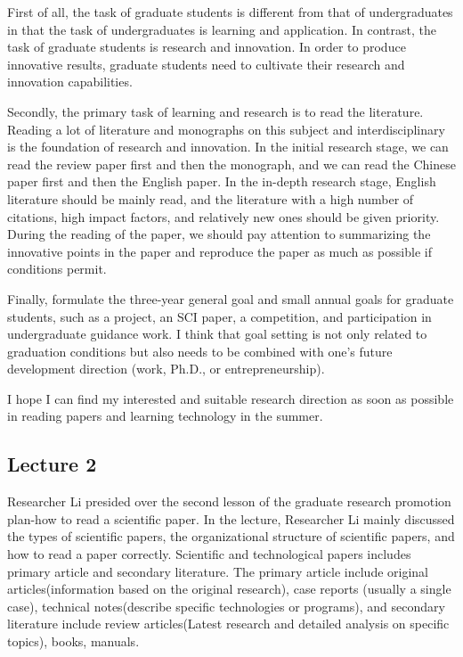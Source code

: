 \documentclass[UTF-8]{ctexart}
\begin{document}
First of all, the task of graduate students is different from that of undergraduates in that the task of undergraduates is learning and application. In contrast, the task of graduate students is research and innovation. In order to produce innovative results, graduate students need to cultivate their research and innovation capabilities.

Secondly, the primary task of learning and research is to read the literature. Reading a lot of literature and monographs on this subject and interdisciplinary is the foundation of research and innovation. In the initial research stage, we can read the review paper first and then the monograph, and we can read the Chinese paper first and then the English paper. In the in-depth research stage, English literature should be mainly read, and the literature with a high number of citations, high impact factors, and relatively new ones should be given priority. During the reading of the paper, we should pay attention to summarizing the innovative points in the paper and reproduce the paper as much as possible if conditions permit.

Finally, formulate the three-year general goal and small annual goals for graduate students, such as a project, an SCI paper, a competition, and participation in undergraduate guidance work. I think that goal setting is not only related to graduation conditions but also needs to be combined with one's future development direction (work, Ph.D., or entrepreneurship).

I hope I can find my interested and suitable research direction as soon as possible in reading papers and learning technology in the summer.

\subsection{Lecture 2}
Researcher Li presided over the second lesson of the graduate research promotion plan-how to read a scientific paper. In the lecture, Researcher Li mainly discussed the types of scientific papers, the organizational structure of scientific papers, and how to read a paper correctly.
Scientific and technological papers includes primary article and secondary literature. The primary article include original articles(information based on the original research), case reports (usually a single case), technical notes(describe specific technologies or programs), and secondary literature include review articles(Latest research and detailed analysis on specific topics), books, manuals.
\end{document}
